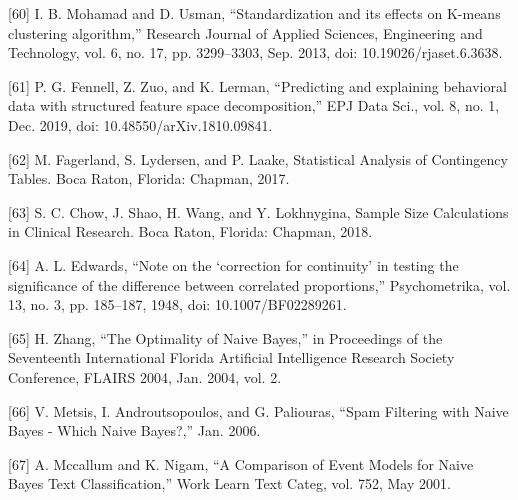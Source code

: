 \let\LaTeXcline\cline\documentclass[sn-mathphys-num]{sn-jnl}\let\cline\LaTeXcline
\begin{document}
[60] I. B. Mohamad and D. Usman, “Standardization and its effects on K-means clustering algorithm,” Research Journal of Applied Sciences, Engineering and Technology, vol. 6, no. 17, pp. 3299–3303, Sep. 2013, doi: 10.19026/rjaset.6.3638.

[61] P. G. Fennell, Z. Zuo, and K. Lerman, “Predicting and explaining behavioral data with structured feature space decomposition,” EPJ Data Sci., vol. 8, no. 1, Dec. 2019, doi: 10.48550/arXiv.1810.09841.

[62] M. Fagerland, S. Lydersen, and P. Laake, Statistical Analysis of Contingency Tables. Boca Raton, Florida: Chapman, 2017.

[63] S. C. Chow, J. Shao, H. Wang, and Y. Lokhnygina, Sample Size Calculations in Clinical Research. Boca Raton, Florida: Chapman, 2018.

[64] A. L. Edwards, “Note on the ‘correction for continuity’ in testing the significance of the difference between correlated proportions,” Psychometrika, vol. 13, no. 3, pp. 185–187, 1948, doi: 10.1007/BF02289261.

[65] H. Zhang, “The Optimality of Naive Bayes,” in Proceedings of the Seventeenth International Florida Artificial Intelligence Research Society Conference, FLAIRS 2004, Jan. 2004, vol. 2.

[66] V. Metsis, I. Androutsopoulos, and G. Paliouras, “Spam Filtering with Naive Bayes - Which Naive Bayes?,” Jan. 2006.

[67] A. Mccallum and K. Nigam, “A Comparison of Event Models for Naive Bayes Text Classification,” Work Learn Text Categ, vol. 752, May 2001.
\end{document}
